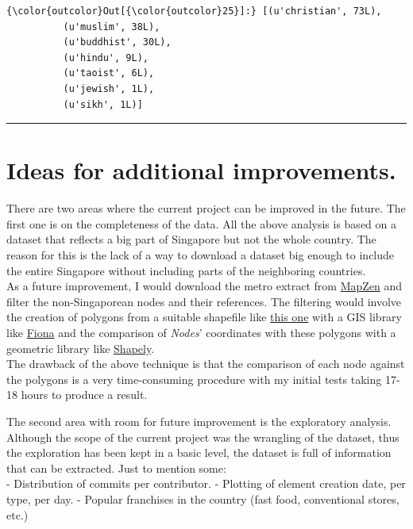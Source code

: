 \documentclass[11pt]{article}
\begin{document}
            \begin{Verbatim}[commandchars=\\\{\}]
{\color{outcolor}Out[{\color{outcolor}25}]:} [(u'christian', 73L),
          (u'muslim', 38L),
          (u'buddhist', 30L),
          (u'hindu', 9L),
          (u'taoist', 6L),
          (u'jewish', 1L),
          (u'sikh', 1L)]
\end{Verbatim}
        
    \begin{center}\color{brown}\rule{1\linewidth}{\linethickness}\end{center}

    \section*{Ideas for additional
improvements.}\label{ideas-for-additional-improvements.}

    There are two areas where the current project can be improved in the
future. The first one is on the completeness of the data. All the above
analysis is based on a dataset that reflects a big part of Singapore but
not the whole country. The reason for this is the lack of a way to
download a dataset big enough to include the entire Singapore without
including parts of the neighboring countries.\\
As a future improvement, I would download the metro extract from
\href{https://mapzen.com/data/metro-extracts/metro/singapore/}{MapZen}
and filter the non-Singaporean nodes and their references. The filtering
would involve the creation of polygons from a suitable shapefile like
\href{http://www.diva-gis.org/gdata}{this one} with a GIS library like
\href{https://pypi.python.org/pypi/Fiona}{Fiona} and the comparison of
\emph{Nodes}' coordinates with these polygons with a geometric library
like \href{https://github.com/Toblerity/Shapely}{Shapely}.\\
The drawback of the above technique is that the comparison of each node
against the polygons is a very time-consuming procedure with my initial
tests taking 17-18 hours to produce a result.

    The second area with room for future improvement is the exploratory
analysis. Although the scope of the current project was the wrangling of
the dataset, thus the exploration has been kept in a basic level, the
dataset is full of information that can be extracted. Just to mention
some:\\
- Distribution of commits per contributor. - Plotting of element
creation date, per type, per day. - Popular franchises in the country
(fast food, conventional stores, etc.)
\end{document}
